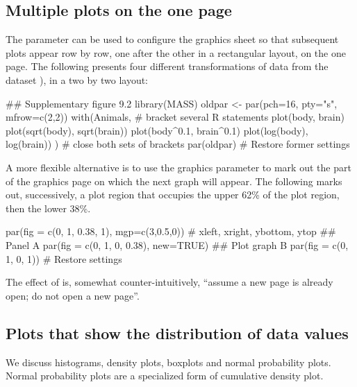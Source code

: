 \subsection{Multiple plots on the one page}\label{ss:xplots}
The parameter  can be used to configure the graphics
sheet so that subsequent plots appear row by row, one after the
other in a rectangular layout, on the one page. The following
presents four different transformations of data from the dataset
), in a two by two layout:
\begin{Schunk}
\begin{Sinput}
## Supplementary figure 9.2
library(MASS)
oldpar <- par(pch=16, pty="s", mfrow=c(2,2))
with(Animals, {      # bracket several R statements
  plot(body, brain)
  plot(sqrt(body), sqrt(brain))
  plot(body^0.1, brain^0.1)
  plot(log(body), log(brain))
})                   # close both sets of brackets
par(oldpar)          # Restore former settings
\end{Sinput}
\end{Schunk}

A more flexible alternative is to use the graphics parameter
 to mark out the part of the graphics page on which the
next graph will appear.  The following marks out, successively,
a plot region that occupies the upper 62\% of the plot region,
then the lower 38\%.
\begin{Schunk}
\begin{Sinput}
par(fig = c(0, 1, 0.38, 1), mgp=c(3,0.5,0))
          # xleft, xright, ybottom, ytop
## Panel A
par(fig = c(0, 1, 0, 0.38), new=TRUE)
## Plot graph B
par(fig = c(0, 1, 0, 1))    # Restore settings
\end{Sinput}
\end{Schunk}
The effect of  is, somewhat
counter-intuitively, ``assume a new page is already open; do not open
a new page''.

\subsection{Plots that show the distribution of data values}
  We discuss
histograms, density plots, boxplots and normal probability plots.
Normal probability plots are a specialized form of cumulative
density plot.


